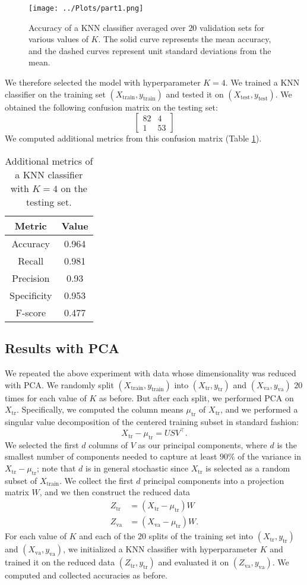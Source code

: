 \documentclass[12pt]{article}
\newcommand{\Xtrain}{X_{\mbox{train}}}
\newcommand{\ytrain}{y_{\mbox{train}}}
\newcommand{\Xtest}{X_{\mbox{test}}}
\newcommand{\ytest}{y_{\mbox{test}}}
\newcommand{\Xtr}{X_{\mbox{tr}}}
\newcommand{\ytr}{y_{\mbox{tr}}}
\newcommand{\Xva}{X_{\mbox{va}}}
\newcommand{\yva}{y_{\mbox{va}}}
\newcommand{\Ztr}{Z_{\mbox{tr}}}
\newcommand{\Zva}{Z_{\mbox{va}}}
\newcommand{\mutr}{\mu_{\mbox{tr}}}
\begin{document}
\begin{figure}
\centering
\texttt{[image: ../Plots/part1.png]}
\caption{\label{part1} Accuracy of a KNN classifier averaged over $20$ validation sets for various values of $K$. The solid curve represents the mean accuracy, and the dashed curves represent unit standard deviations from the mean.}
\end{figure}

We therefore selected the model with hyperparameter $K=4$. We trained a KNN classifier on the training set $(\Xtrain, \ytrain)$ and tested it on $(\Xtest, \ytest)$. We obtained the following confusion matrix on the testing set:
\[ \begin{bmatrix}
82 & 4 \\
1 & 53
\end{bmatrix} \]
We computed additional metrics from this confusion matrix (Table \ref{part1-table}).

\begin{table}
\centering
\begin{tabular}{|c|c|} \hline
Metric & Value \\ \hline
Accuracy & 0.964 \\
Recall & 0.981 \\
Precision & 0.93 \\
Specificity & 0.953 \\
F-score & 0.477 \\ \hline
\end{tabular}
\caption{\label{part1-table} Additional metrics of a KNN classifier with $K=4$ on the testing set.}
\end{table}


\subsection{Results with PCA}

We repeated the above experiment with data whose dimensionality was reduced with PCA. We randomly split $(\Xtrain, \ytrain)$ into $(\Xtr, \ytr)$ and $(\Xva, \yva)$ $20$ times for each value of $K$ as before. But after each split, we performed PCA on $\Xtr$. Specifically, we computed the column means $\mutr$ of $\Xtr$, and we performed a singular value decomposition of the centered training subset in standard fashion:
\[ \Xtr-\mutr = U S V^\top. \]
We selected the first $d$ columns of $V$ as our principal components, where $d$ is the smallest number of components needed to capture at least $90\%$ of the variance in $\Xtr-\mutr$; note that $d$ is in general stochastic since $\Xtr$ is selected as a random subset of $\Xtrain$. We collect the first $d$ principal components into a projection matrix $W$, and we then construct the reduced data
\begin{align*}
\Ztr &= (\Xtr-\mutr)W \\
\Zva &= (\Xva-\mutr)W.
\end{align*}
For each value of $K$ and each of the $20$ splits of the training set into $(\Xtr, \ytr)$ and $(\Xva, \yva)$, we initialized a KNN classifier with hyperparameter $K$ and trained it on the reduced data $(\Ztr, \ytr)$ and evaluated it on $(\Zva, \yva)$. We computed and collected accuracies as before.
\end{document}
